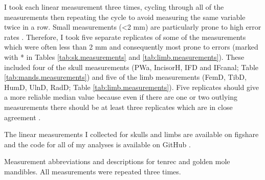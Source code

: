	I took each linear measurement three times, cycling through all of the measurements then repeating the cycle to avoid measuring the same variable twice in a row. Small measurements (<2 mm) are particularly prone to high error rates \citep{Cardini2008}. Therefore, I took five separate replicates of some of the measurements which were often less than 2 mm and consequently most prone to errors (marked with * in Tables \ref{tab:sk.measurements} and \ref{tab:limb.measurements}). These included four of the skull measurements (PWa, IncisorH, IFD and IFcanal; Table \ref{tab:mands.measurements}) and five of the limb measurements (FemD, TibD, HumD, UlnD, RadD; Table \ref{tab:limb.measurements}). 
	Five replicates should give a more reliable median value because even if there are one or two outlying measurements there should be at least three replicates which are in close agreement \citep{Cooper2009}.

	The linear measurements I collected for skulls \citep{Finlay2015b} and limbs \citep{Finlay2015a} are available on figshare and the code for all of my analyses is available on GitHub \citep{Finlay2015c}.
\begin{center}
\begin{table}[!htbp]
	\caption[Mandible measurements]
			{Measurement abbreviations and descriptions for tenrec and golden mole mandibles. All measurements were repeated three times.}
	
	\label{tab:mands.measurements}
\end{table}
\end{center}
\newpage

